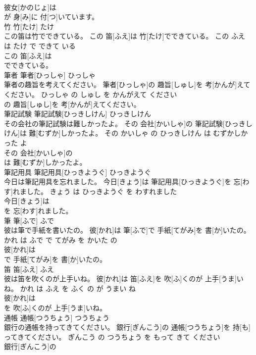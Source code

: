 \documentclass[8pt]{extreport}
\begin{document}
\begin{CJK}{UTF8}{min}
\\	彼女[かのじょ]は
\\	が 身[み]に 付[つ]いています。			
\\	竹	竹[たけ]	たけ	
\\	この笛は竹でできている。	この 笛[ふえ]は 竹[たけ]でできている。	この ふえ は たけ で できて いる	
\\	この 笛[ふえ]は
\\	でできている。			
\\	筆者	筆者[ひっしゃ]	ひっしゃ	
\\	筆者の趣旨を考えてください。	筆者[ひっしゃ]の 趣旨[しゅし]を 考[かんが]えてください。	ひっしゃ の しゅし を かんがえて ください	
\\	の 趣旨[しゅし]を 考[かんが]えてください。			
\\	筆記試験	筆記試験[ひっきしけん]	ひっきしけん	
\\	その会社の筆記試験は難しかったよ。	その 会社[かいしゃ]の 筆記試験[ひっきしけん]は 難[むずか]しかったよ。	その かいしゃ の ひっきしけん は むずかしかった よ	
\\	その 会社[かいしゃ]の
\\	は 難[むずか]しかったよ。			
\\	筆記用具	筆記用具[ひっきようぐ]	ひっきようぐ	
\\	今日は筆記用具を忘れました。	今日[きょう]は 筆記用具[ひっきようぐ]を 忘[わす]れました。	きょう は ひっきようぐ を わすれました	
\\	今日[きょう]は
\\	を 忘[わす]れました。			
\\	筆	筆[ふで]	ふで	
\\	彼は筆で手紙を書いたの。	彼[かれ]は 筆[ふで]で 手紙[てがみ]を 書[か]いたの。	かれ は ふで で てがみ を かいた の	
\\	彼[かれ]は
\\	で 手紙[てがみ]を 書[か]いたの。			
\\	笛	笛[ふえ]	ふえ	
\\	彼は笛を吹くのが上手いね。	彼[かれ]は 笛[ふえ]を 吹[ふ]くのが 上手[うま]いね。	かれ は ふえ を ふく の が うまい ね	
\\	彼[かれ]は
\\	を 吹[ふ]くのが 上手[うま]いね。			
\\	通帳	通帳[つうちょう]	つうちょう	
\\	銀行の通帳を持ってきてください。	銀行[ぎんこう]の 通帳[つうちょう]を 持[も]ってきてください。	ぎんこう の つうちょう を もって きて ください	
\\	銀行[ぎんこう]の

\end{CJK}
\end{document}
